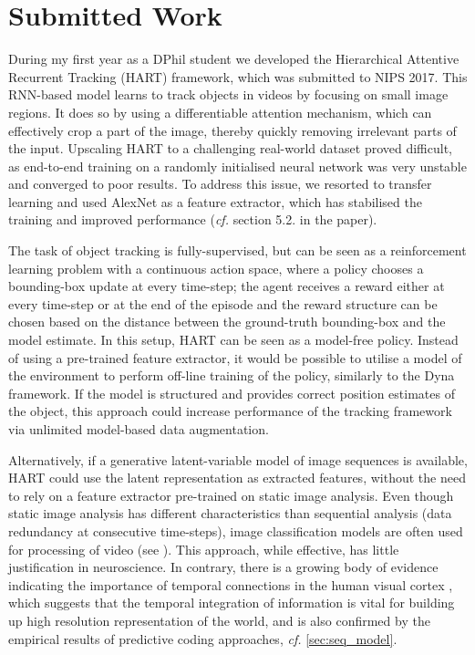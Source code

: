 \section{Submitted Work}
\label{sec:done}

    During my first year as a DPhil student we developed the Hierarchical Attentive Recurrent Tracking (HART) framework, which was submitted to NIPS 2017. 
    This RNN-based model learns to track objects in videos by focusing on small image regions. It does so by using a differentiable attention mechanism, which can effectively crop a part of the image, thereby quickly removing irrelevant parts of the input.
    Upscaling HART to a challenging real-world dataset proved difficult, as end-to-end training on a randomly initialised neural network was very unstable and converged to poor results. 
    To address this issue, we resorted to transfer learning and used AlexNet \citep{Krizhevsky2012} as a feature extractor, which has stabilised the training and improved performance (\emph{cf.} section 5.2. in the paper).
    
    The task of object tracking is fully-supervised, but can be seen as a reinforcement learning problem \citep{Zhang2017a} with a continuous action space, where a policy chooses a bounding-box update at every time-step; the agent receives a reward either at every time-step or at the end of the episode and the reward structure can be chosen based on the distance between the ground-truth bounding-box and the model estimate. In this setup, HART can be seen as a model-free policy. Instead of using a pre-trained feature extractor, it would be possible to utilise a model of the environment to perform off-line training of the policy, similarly to the Dyna framework. If the model is structured and provides correct position estimates of the object, this approach could increase performance of the tracking framework via unlimited model-based data augmentation.
    
    Alternatively, if a generative latent-variable model of image sequences is available, HART could use the latent representation as extracted features, without the need to rely on a feature extractor pre-trained on static image analysis. Even though static image analysis has different characteristics than sequential analysis (\eg data redundancy at consecutive time-steps), image classification models are often used for processing of video (see \eg \cite{Ning2016a}). 
    This approach, while effective, has little justification in neuroscience. 
    In contrary, there is a growing body of evidence indicating the importance of temporal connections in the human visual cortex \citep{Ungerleider2000}, which suggests that the temporal integration of information is vital for building up high resolution representation of the world, and is also confirmed by the empirical results of predictive coding approaches, \emph{cf.} \cref{sec:seq_model}.
    
